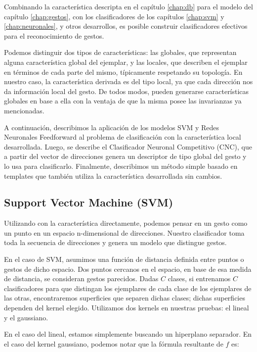 
Combinando la característica descripta en el capítulo \ref{chap:db} para el modelo del capítulo \ref{chap:gestos}, con los clasificadores de los capítulos \ref{chap:svm} y \ref{chap:neuronales}, y otros desarrollos, es posible construir clasificadores efectivos para el reconocimiento de gestos.

Podemos distinguir dos tipos de características: las globales, que representan alguna característica global del ejemplar, y las locales, que describen el ejemplar en términos de cada parte del mismo, típicamente respetando su topología. En nuestro caso, la característica derivada es del tipo local, ya que cada dirección nos da información local del gesto. De todos modos, pueden generarse características globales en base a ella con la ventaja de que la misma posee las invarianzas ya mencionadas.

A continuación, describimos la aplicación de los modelos SVM y Redes Neuronales Feedforward al problema de clasificación con la característica local desarrollada. Luego, se describe el Clasificador Neuronal Competitivo (CNC), que a partir del vector de direcciones genera un descriptor de tipo global del gesto y lo usa para clasificarlo. Finalmente, describimos un método simple basado en templates que también utiliza la característica desarrollada sin cambios. 

\subsection{Support Vector Machine (SVM)}

Utilizando con la característica directamente, podemos pensar en un gesto como un punto en un espacio n-dimensional de direcciones. Nuestro clasificador toma toda la secuencia de direcciones y genera un modelo que distingue gestos.

En el caso de SVM, asumimos una función de distancia definida entre puntos o gestos de dicho espacio. Dos puntos cercanos en el espacio, en base de esa medida de distancia, se consideran gestos parecidos. Dadas $C$ clases, si entrenamos $C$ clasificadores para que distingan los ejemplares de cada clase de los ejemplares de las otras, encontraremos superficies que separen dichas clases; dichas superficies dependen del kernel elegido. Utilizamos dos kernels en nuestras pruebas: el lineal y el gaussiano. 


En el caso del lineal, estamos simplemente buscando un hiperplano separador. En el caso del kernel gaussiano, podemos notar que la fórmula resultante de $f$ es:

